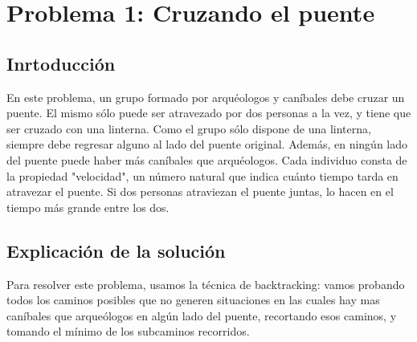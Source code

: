 \documentclass[spanish,12pt]{article}
\begin{document}
\author{Grupo  \\Alvarez Vico Jazm\'in\\Cortés Conde Titó Javier María\\Pedraza Marcelo \\ Rozenberg Uriel Jonathan}


\maketitle


\clearpage

\tableofcontents
\cleardoublepage

\section{Problema 1: Cruzando el puente}

\subsection{Inrtoducción}

En este problema, un grupo formado por arquéologos y caníbales debe cruzar un puente. El mismo sólo puede ser atravezado por dos personas a la vez, y tiene que ser cruzado con una linterna. Como el grupo sólo dispone de una linterna, siempre debe regresar alguno al lado del puente original. Además, en ningún lado del puente puede haber más caníbales que arquéologos.
Cada individuo consta de la propiedad "velocidad", un número natural que indica cuánto tiempo tarda en atravezar el puente. Si dos personas atraviezan el puente juntas, lo hacen en el tiempo más grande entre los dos.


\subsection{Explicación de la solución}
Para resolver este problema, usamos la técnica de backtracking: vamos probando todos los caminos posibles que no generen situaciones en las cuales hay mas caníbales que arqueólogos en algún lado del puente, recortando esos caminos, y tomando  el mínimo de los subcaminos recorridos.
\end{document}

